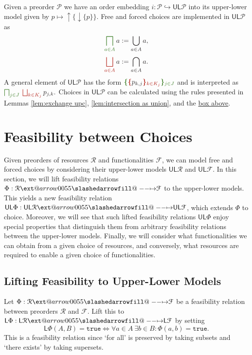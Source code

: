 \documentclass[12pt]{article}
\makeatletter
\theoremstyle{definition}
\theoremstyle{plain}
\theoremstyle{plain}
\theoremstyle{plain}
\theoremstyle{plain}
\theoremstyle{remark}
\theoremstyle{remark}
\newcommand{\mc}[1]{\mathcal{#1}}
\newcommand{\low}{\mathsf{L}}
\newcommand{\upper}{\mathsf{U}}
\newcommand{\true}{\mathtt{true}}
\newcommand{\upc}[1]{{\uparrow #1}}
\newcommand{\lwc}[1]{{\downarrow #1}}
\def\slashedarrowfill@#1#2#3#4#5{%
	$\m@th\thickmuskip0mu\medmuskip\thickmuskip\thinmuskip\thickmuskip
	\relax#5#1\mkern-7mu%
	\cleaders\hbox{$#5\mkern-2mu#2\mkern-2mu$}\hfill
	\mathclap{#3}\mathclap{#2}%
	\cleaders\hbox{$#5\mkern-2mu#2\mkern-2mu$}\hfill
	\mkern-7mu#4$%
}
\def\rightslashedarrowfill@{%
	\slashedarrowfill@\relbar\relbar\mapstochar\rightarrow}
\newcommand\xslashedrightarrow[2][]{%
	\ext@arrow 0055{\rightslashedarrowfill@}{#1}{#2}}
\newcommand{\cbigsqcap}[1]{\color{OliveGreen}\bigsqcap_{#1}\color{Black}}
\newcommand{\cbigsqcup}[1]{\color{BrickRed}\bigsqcup_{#1}\color{Black}}
\makeatother
\begin{document}
\begin{tcolorbox}[title=Working in the Upper-Lower Model, colframe=Apricot, colback = paleorange, coltitle = Sepia]
Given a preorder $\mc{P}$ we have an order embedding $i: \mc{P} \hookrightarrow \upper\low\mc{P}$ into its upper-lower model given by $p \mapsto \upc\{\lwc\{p\}\}$. Free and forced choices are implemented in $\upper\low\mc{P}$ as
$$ \cbigsqcap{a \in A} a :=  \bigcup_{a \in A} a,$$
$$ \cbigsqcup{a \in A} a := \bigcap_{a \in A} a.$$
A general element of $\upper\low\mc{P}$ has the form 
$
\color{OliveGreen} \bm{\{} \color{Black} \color{BrickRed} \bm{\{} \color{Black} p_{k,j} \color{BrickRed} \bm{\}}_{k \in K_j} \color{Black}  \color{OliveGreen} \bm{\}}_{j \in J} \color{Black}
$
and is interpreted as
$\cbigsqcap{j \in J} \: \cbigsqcup{k \in K_j} p_{j,k}.$ Choices in $\upper\low\mc{P}$ can be calculated using the rules presented in Lemmas \ref{lem:exchange upc}, \ref{lem:intersection as union}, and the \hyperlink{box:calc rules}{box above}.
\end{tcolorbox}

\newpage
\section{Feasibility between Choices}
Given preorders of resources $\mc{R}$ and functionalities $\mc{F}$, we can model free and forced choices by considering their upper-lower models $\upper\low\mc{R}$ and $\upper\low\mc{F}$. In this section, we will lift feasibility relations $\Phi: \mc{R} \xslashedrightarrow{} \mc{F}$ to the upper-lower models. This yields a new feasibility relation $\upper\low\Phi: \upper\low\mc{R} \xslashedrightarrow{} \upper\low\mc{F}$, which extends $\Phi$ to choice. Moreover, we will see that such lifted feasibility relations $\upper\low\Phi$ enjoy special properties that distinguish them from arbitrary feasibility relations between the upper-lower models. Finally, we will consider what functionalities we can obtain from a given choice of resources, and conversely, what resources are required to enable a given choice of functionalities.

\subsection{Lifting Feasibility to Upper-Lower Models}\label{sec:lifting feasibility}
Let $\Phi: \mc{R} \xslashedrightarrow{} \mc{F}$ be a feasibility relation between preorders $\mc{R}$ and $\mc{F}$. Lift this to $\low\Phi: \low\mc{R} \xslashedrightarrow{} \low\mc{F}$ by setting 
$$\low\Phi(A,B) = \true \iff \forall a \in A \: \exists b \in B: \Phi(a,b)=\true.$$
This is a feasibility relation since `for all' is preserved by taking subsets and `there exists' by taking supersets. 
\end{document}
